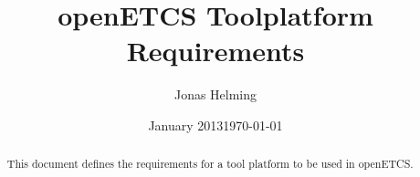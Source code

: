 \documentclass{template/openetcs_article}
\begin{document}
\frontmatter
{}




\title{openETCS Toolplatform Requirements}


\date{January 2013}
\date{\today}




\author{Jonas Helming}



    



\begin{abstract}
This document defines the requirements for a tool platform to be used in openETCS.

\end{abstract}

\maketitle
\tableofcontents
\newpage








\setlength{\marginparwidth}{1in}
\let\oldmarginpar\marginpar
\renewcommand\marginpar[1]{\-\oldmarginpar[\raggedleft\scriptsize #1]%
{\raggedright\scriptsize #1}}

\newcommand{\oldtext}[1]{{Old: \scriptsize #1}}

\newenvironment{inoutput}
{\vspace{2mm}
\noindent
\begin{tabular}{|r|p{.68\linewidth}|l|}
\hline}
{
\hline
\end{tabular}}
\end{document}
